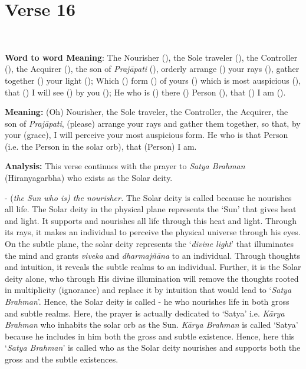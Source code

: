\chapter{Verse 16}

\begin{moolashloka}
\\
\end{moolashloka}

\textbf{Word to word Meaning}: The Nourisher (), the Sole traveler (), the Controller (), the Acquirer (), the son of \emph{Prajāpati} (), orderly arrange () your rays (), gather together () your light (); Which () form () of yours () which is most auspicious (), that () I will see () by you (); He who is () there () Person (), that () I am ().

\textbf{Meaning:} (Oh) Nourisher, the Sole traveler, the Controller, the Acquirer, the son of \emph{Prajāpati}, (please) arrange your rays and gather them together, so that, by your (grace), I will perceive your most auspicious form. He who is that Person (i.e. the Person in the solar orb), that (Person) I am.

\textbf{Analysis:} This verse continues with the prayer to \emph{Satya Brahman} (Hiranyagarbha) who exists as the Solar deity.

- (\emph{the Sun who is) the nourisher.} The Solar deity is called  because he nourishes all life. The Solar deity in the physical plane represents the `Sun' that gives heat and light. It supports and nourishes all life through this heat and light. Through its rays, it makes an individual to perceive the physical universe through his eyes. On the subtle plane, the solar deity represents the `\emph{divine light}' that illuminates the mind and grants \emph{viveka} and \emph{dharmajñāna} to an individual. Through thoughts and intuition, it reveals the subtle realms to an individual. Further, it is the Solar deity alone, who through His divine illumination will remove the thoughts rooted in multiplicity (ignorance) and replace it by intuition that would lead to `\emph{Satya Brahman}'. Hence, the Solar deity is called - he who nourishes life in both gross and subtle realms. Here, the prayer is actually dedicated to `Satya' i.e. \emph{Kārya Brahman} who inhabits the solar orb as the Sun. \emph{Kārya Brahman} is called `Satya' because he includes in him both the gross and subtle existence. Hence, here this `\emph{Satya Brahman}' is called  who as the Solar deity nourishes and supports both the gross and the subtle existences.

